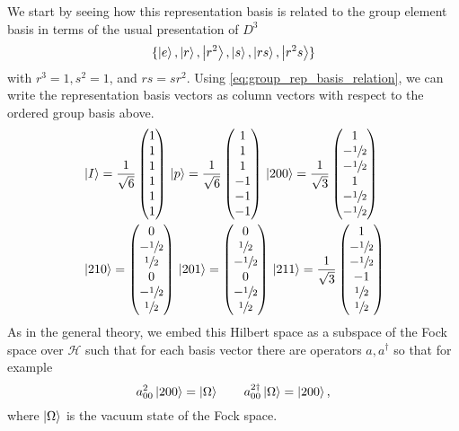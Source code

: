 \documentclass[11pt,reqno]{amsart}
\numberwithin{equation}{section}
\begin{document}
	We start by seeing how this representation basis is related to the group element basis in terms of the usual presentation of $D^3$	
		\[\{\ket{e}, \ket{r}, \ket{r^2}, \ket{s}, \ket{rs}, \ket{r^2s}\}\]
 	with $r^3=1, s^2=1$, and $rs=sr^2$.
 	Using \cref{eq:group_rep_basis_relation}, we can write the representation basis vectors as column vectors with respect to the ordered group basis above.
 	\begin{align*}
 		&\ket{I}=\frac{1}{\sqrt{6}}\begin{pmatrix}
 		1 \\ 1 \\ 1 \\ 1 \\ 1 \\ 1
 		\end{pmatrix}\,
 		\ket{p}=\frac{1}{\sqrt{6}}\begin{pmatrix}
 		1 \\ 1 \\ 1 \\ -1 \\ -1 \\ -1
 		\end{pmatrix}\,
 		\ket{200}=\frac{1}{\sqrt{3}}\begin{pmatrix}
 		1 \\ -\sfrac{1}{2} \\ -\sfrac{1}{2} \\ 1 \\ -\sfrac{1}{2} \\ -\sfrac{1}{2}
 		\end{pmatrix}\,\\
 		&\ket{210}=\begin{pmatrix}
 		0 \\ -\sfrac{1}{2} \\ \sfrac{1}{2} \\ 0 \\ -\sfrac{1}{2} \\ \sfrac{1}{2}
 		\end{pmatrix}\,
 		\ket{201}=\begin{pmatrix}
 		0 \\ \sfrac{1}{2} \\ -\sfrac{1}{2} \\ 0 \\ -\sfrac{1}{2} \\ \sfrac{1}{2}
 		\end{pmatrix}\,
 		\ket{211}=\frac{1}{\sqrt{3}}\begin{pmatrix}
 		1 \\ -\sfrac{1}{2} \\ -\sfrac{1}{2} \\ -1 \\ \sfrac{1}{2} \\ \sfrac{1}{2}
 		\end{pmatrix}
 	\end{align*}
	As in the general theory, we embed this Hilbert space as a subspace of the Fock space over $\mathcal{H}$ such that for each basis vector there are operators $a,a^\dagger$ so that for example
		\[a^2_{00}\ket{200}=\ket{\Omega} \qquad a^{2\dagger}_{00}\ket{\Omega}=\ket{200}, \]
	where $\ket{\Omega}$ is the vacuum state of the Fock space.
	
\end{document}
